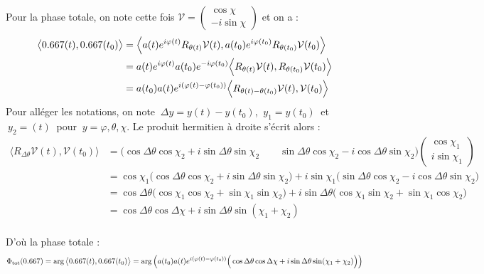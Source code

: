 \begin{demo}
	Pour la phase totale, on note cette fois $\mathcal{V} = \begin{pmatrix} \cos\chi \\ -i\sin\chi \end{pmatrix}$ et on a :
	\begin{align*}
		\big\langle \x(t), \x(t_0)\big\rangle &= \Big\langle a(t)e^{i\varphi(t)}R_{\theta(t)}\mathcal{V}(t), a(t_0)e^{i\varphi(t_0)}R_{\theta(t_0)}\mathcal{V}(t_0) \Big\rangle \\
		&= a(t)e^{i\varphi(t)} a(t_0)e^{-i\varphi(t_0)} \Big\langle R_{\theta(t)}\mathcal{V}(t), R_{\theta(t_0)}\mathcal{V}(t_0) \Big\rangle \\
		&= a(t_0)a(t)e^{i(\varphi(t)-\varphi(t_0))}\Big\langle R_{\theta(t)- \theta(t_0)}\mathcal{V}(t), \mathcal{V}(t_0) \Big\rangle
	\end{align*}
	Pour alléger les notations, on note $\ \Delta y =y(t)-y(t_0)$, $\ y_1=y(t_0)\ $ et $\ y_2=(t)\ $ pour $\ y=\varphi,\theta,\chi$. Le produit hermitien à droite s'écrit alors :
	\begin{align*}
		\Big\langle R_{\Delta\theta}\mathcal{V}(t), \mathcal{V}(t_0) \Big\rangle &=   \Big(\cos\Delta\theta \cos\chi_2 + i\sin\Delta\theta \sin\chi_2 \qquad \sin\Delta\theta \cos\chi_2 - i\cos\Delta\theta \sin\chi_2\Big) \begin{pmatrix} \cos\chi_1 \\ i\sin\chi_1 \end{pmatrix} \\
		&= \cos\chi_1\Big(\cos\Delta\theta \cos\chi_2 + i\sin\Delta\theta \sin\chi_2\Big) + i\sin\chi_1\Big(\sin\Delta\theta \cos\chi_2 - i\cos\Delta\theta \sin\chi_2\Big) \\
		&= \cos\Delta\theta \Big(\cos\chi_1 \cos\chi_2 + \sin\chi_1 \sin\chi_2\Big) + i\sin\Delta\theta \Big( \cos\chi_1 \sin\chi_2 + \sin\chi_1\cos\chi_2\Big) \\
		&= \cos\Delta\theta \cos\Delta\chi + i\sin\Delta\theta \sin(\chi_1+\chi_2)
	\end{align*}
	\\
	D'où la phase totale :
	\begin{align*}
		\phaset(\x) = \arg\big\langle \x(t), \x(t_0)\big\rangle &= \arg\left( a(t_0)a(t)e^{i(\varphi(t) - \varphi(t_0))}\Big( \cos\Delta\theta \cos\Delta\chi + i\sin\Delta\theta \sin(\chi_1+\chi_2) \Big) \right) \\

\end{align*}
\end{demo}
